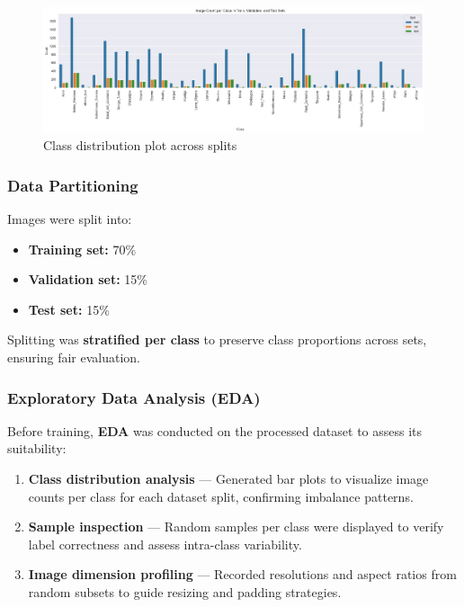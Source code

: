 \documentclass[
  12pt,
  oneside]{article}
\providecommand{\tightlist}{%
  \setlength{\itemsep}{0pt}\setlength{\parskip}{0pt}}
\begin{document}
\begin{figure}

{\centering \includegraphics[width=1\linewidth]{class_distribution} 

}

\caption{Class distribution plot across splits}\label{fig:unnamed-chunk-2}
\end{figure}

\subsubsection{Data Partitioning}\label{data-partitioning}

Images were split into:

\begin{itemize}
\tightlist
\item
  \textbf{Training set:} 70\%
\item
  \textbf{Validation set:} 15\%
\item
  \textbf{Test set:} 15\%
\end{itemize}

Splitting was \textbf{stratified per class} to preserve class
proportions across sets, ensuring fair evaluation.

\subsubsection{Exploratory Data Analysis
(EDA)}\label{exploratory-data-analysis-eda}

Before training, \textbf{EDA} was conducted on the processed dataset to
assess its suitability:

\begin{enumerate}
\def\labelenumi{\arabic{enumi}.}
\tightlist
\item
  \textbf{Class distribution analysis} --- Generated bar plots to
  visualize image counts per class for each dataset split, confirming
  imbalance patterns.
\item
  \textbf{Sample inspection} --- Random samples per class were displayed
  to verify label correctness and assess intra-class variability.
\item
  \textbf{Image dimension profiling} --- Recorded resolutions and aspect
  ratios from random subsets to guide resizing and padding strategies.
\end{enumerate}
\end{document}
